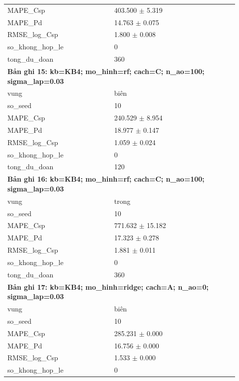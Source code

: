 \begin{longtable}{p{0.43\linewidth}p{0.50\linewidth}}
MAPE\_\allowbreak Csp & 403.500 $\pm$ 5.319 \\
MAPE\_\allowbreak Pd & 14.763 $\pm$ 0.075 \\
RMSE\_\allowbreak log\_\allowbreak Csp & 1.800 $\pm$ 0.008 \\
so\_\allowbreak khong\_\allowbreak hop\_\allowbreak le & 0 \\
tong\_\allowbreak du\_\allowbreak doan & 360 \\
\midrule
\multicolumn{2}{p{0.95\linewidth}}{\textbf{Bản ghi 15: kb=KB4; mo\_hinh=rf; cach=C; n\_ao=100; sigma\_lap=0.03}} \\
vung & biên \\
so\_\allowbreak seed & 10 \\
MAPE\_\allowbreak Csp & 240.529 $\pm$ 8.954 \\
MAPE\_\allowbreak Pd & 18.977 $\pm$ 0.147 \\
RMSE\_\allowbreak log\_\allowbreak Csp & 1.059 $\pm$ 0.024 \\
so\_\allowbreak khong\_\allowbreak hop\_\allowbreak le & 0 \\
tong\_\allowbreak du\_\allowbreak doan & 120 \\
\midrule
\multicolumn{2}{p{0.95\linewidth}}{\textbf{Bản ghi 16: kb=KB4; mo\_hinh=rf; cach=C; n\_ao=100; sigma\_lap=0.03}} \\
vung & trong \\
so\_\allowbreak seed & 10 \\
MAPE\_\allowbreak Csp & 771.632 $\pm$ 15.182 \\
MAPE\_\allowbreak Pd & 17.323 $\pm$ 0.278 \\
RMSE\_\allowbreak log\_\allowbreak Csp & 1.881 $\pm$ 0.011 \\
so\_\allowbreak khong\_\allowbreak hop\_\allowbreak le & 0 \\
tong\_\allowbreak du\_\allowbreak doan & 360 \\
\midrule
\multicolumn{2}{p{0.95\linewidth}}{\textbf{Bản ghi 17: kb=KB4; mo\_hinh=ridge; cach=A; n\_ao=0; sigma\_lap=0.03}} \\
vung & biên \\
so\_\allowbreak seed & 10 \\
MAPE\_\allowbreak Csp & 285.231 $\pm$ 0.000 \\
MAPE\_\allowbreak Pd & 16.756 $\pm$ 0.000 \\
RMSE\_\allowbreak log\_\allowbreak Csp & 1.533 $\pm$ 0.000 \\
so\_\allowbreak khong\_\allowbreak hop\_\allowbreak le & 0 \\

\end{longtable}
